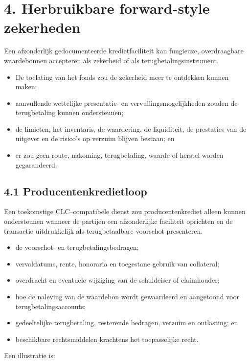 \documentclass[11pt]{article}
\begin{document}
\section*{4. Herbruikbare forward-style zekerheden}

Een afzonderlijk gedocumenteerde kredietfaciliteit kan fungieuze, overdraagbare waardebonnen accepteren als zekerheid of als terugbetalingsinstrument.

\begin{itemize}[leftmargin=*]
\item De toelating van het fonds zou de zekerheid meer te ontdekken kunnen maken;
\item aanvullende wettelijke presentatie- en vervullingsmogelijkheden zouden de terugbetaling kunnen ondersteunen;
\item de limieten, het inventaris, de waardering, de liquiditeit, de prestaties van de uitgever en de risico's op verzuim blijven bestaan; en
\item er zou geen route, nakoming, terugbetaling, waarde of herstel worden gegarandeerd.
\end{itemize}
\subsection*{4.1 Producentenkredietloop}

Een toekomstige CLC--compatibele dienst zou producentenkrediet alleen kunnen ondersteunen wanneer de partijen een afzonderlijke faciliteit oprichten en de transactie uitdrukkelijk als terugbetaalbare voorschot presenteren.

\begin{itemize}[leftmargin=*]
\item de voorschot- en terugbetalingsbedragen;
\item vervaldatums, rente, honoraria en toegestane gebruik van collateral;
\item overdracht en eventuele wijziging van de schuldeiser of claimhouder;
\item hoe de naleving van de waardebon wordt gewaardeerd en aangetoond voor terugbetalingsaccounts;
\item gedeeltelijke terugbetaling, resterende bedragen, verzuim en ontlasting; en
\item beschikbare rechtsmiddelen krachtens het toepasselijke recht.
\end{itemize}
Een illustratie is:
\end{document}
